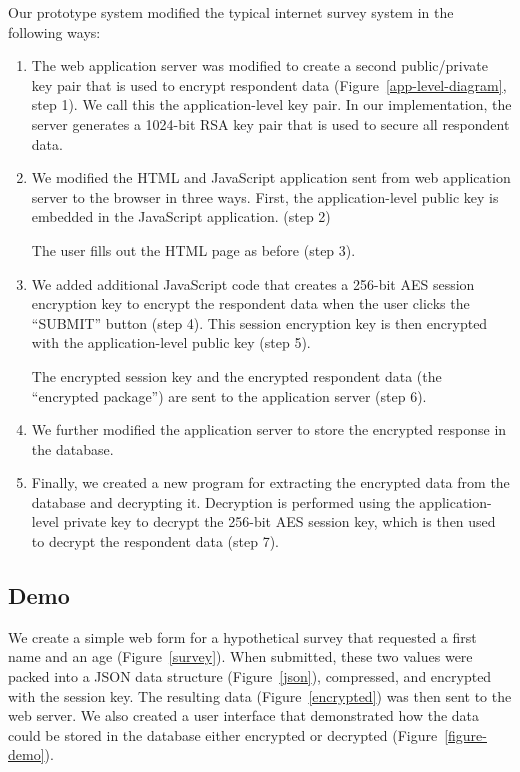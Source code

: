 \documentclass[fleqn,12pt]{wlscirep}
\begin{document}
Our prototype system modified the typical internet survey system in the following ways:

\begin{enumerate}
\item The web application server was modified to create a second
  public/private key pair that is used to encrypt respondent
  data (Figure~\ref{app-level-diagram}, step 1).  We
  call this the application-level key pair. In our implementation, the
  server generates a 1024-bit RSA key pair that is used to secure all
  respondent data.
\item We modified the HTML and JavaScript application sent from web
  application server to the browser in three ways. First, the
  application-level public key is embedded in the JavaScript
  application. (step 2)
  
 The user fills out the HTML page as before (step 3).

\item We added additional JavaScript code that creates a 256-bit
  AES session encryption key to encrypt the respondent data when the user clicks the
  ``SUBMIT'' button (step 4). This session encryption key is then encrypted
  with the application-level public key (step 5).

   The encrypted session key and the encrypted respondent data (the ``encrypted
  package'') are sent to the  application server (step 6). 
\item We further modified the application server to store the encrypted
  response in the database.
\item Finally, we created a new program for extracting the encrypted
  data from the database and decrypting it. Decryption is performed
  using the application-level private key to decrypt the 256-bit AES
  session key, which is then used to decrypt the respondent data (step
  7).
\end{enumerate}


\subsection{Demo}

We create a simple web form for a hypothetical survey that requested a
first name and an age (Figure~\ref{survey}). When submitted, these two
values were packed into a JSON data
structure (Figure~\ref{json}), compressed, and encrypted with the session key. The
resulting data (Figure~\ref{encrypted}) was then sent to the web
server. We also created a user interface that demonstrated how the
data could be stored in the database either encrypted or decrypted (Figure~\ref{figure-demo}).
\end{document}

